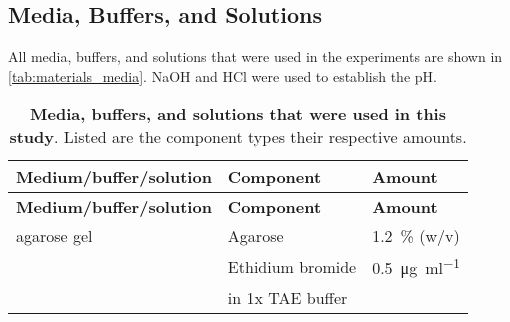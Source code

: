 \subsection{Media, Buffers, and Solutions}
All media, buffers, and solutions that were used in the experiments are shown in \autoref{tab:materials_media}. NaOH and HCl were used to establish the pH. 
\begin{longtable}{@{} l l l @{}}
    \caption{\textbf{Media, buffers, and solutions that were used in this study}. Listed are the component types their respective amounts.} \label{tab:materials_media} \\
        \toprule
        \textbf{Medium/buffer/solution} & \textbf{Component} & \textbf{Amount} \\
        \midrule
        \endfirsthead
        \toprule
        \textbf{Medium/buffer/solution} & \textbf{Component} & \textbf{Amount} \\
        \midrule
        \endhead
        agarose gel & Agarose & \SI{1.2}{\percent} (w/v) \\
                        & Ethidium bromide & \SI{0.5}{\micro\gram\per\milli\litre} \\
                        & in 1x TAE buffer & \\[1ex]
        

\end{longtable}
